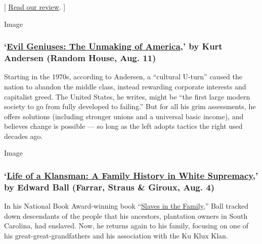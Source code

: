 {[}
\href{https://www.nytimes3xbfgragh.onion/2020/08/04/books/review/the-end-of-everything-katie-mack.html}{Read
our review}. {]}

Image

\hypertarget{evil-geniuses-the-unmaking-of-america-by-kurt-andersen-random-house-aug-11}{%
\subsubsection{\texorpdfstring{`\href{https://www.penguinrandomhouse.com/books/594493/evil-geniuses-by-kurt-andersen/}{Evil
Geniuses: The Unmaking of America},' by Kurt Andersen (Random House,
Aug.
11)}{`Evil Geniuses: The Unmaking of America,' by Kurt Andersen (Random House, Aug. 11)}}\label{evil-geniuses-the-unmaking-of-america-by-kurt-andersen-random-house-aug-11}}

Starting in the 1970s, according to Andersen, a ``cultural U-turn''
caused the nation to abandon the middle class, instead rewarding
corporate interests and capitalist greed. The United States, he writes,
might be ``the first large modern society to go from fully developed to
failing.'' But for all his grim assessments, he offers solutions
(including stronger unions and a universal basic income), and believes
change is possible --- so long as the left adopts tactics the right used
decades ago.

Image

\hypertarget{life-of-a-klansman-a-family-history-in-white-supremacy-by-edward-ball-farrar-straus--giroux-aug-4}{%
\subsubsection{\texorpdfstring{`\href{https://us.macmillan.com/books/9780374186326}{Life
of a Klansman: A Family History in White Supremacy},' by Edward Ball
(Farrar, Straus \& Giroux, Aug.
4)}{`Life of a Klansman: A Family History in White Supremacy,' by Edward Ball (Farrar, Straus \& Giroux, Aug. 4)}}\label{life-of-a-klansman-a-family-history-in-white-supremacy-by-edward-ball-farrar-straus--giroux-aug-4}}

In his National Book Award-winning book
``\href{https://archive.nytimes3xbfgragh.onion/www.nytimes3xbfgragh.onion/books/98/03/01/reviews/980301.01faustt.html}{Slaves
in the Family},'' Ball tracked down descendants of the people that his
ancestors, plantation owners in South Carolina, had enslaved. Now, he
returns again to his family, focusing on one of his
great-great-grandfathers and his association with the Ku Klux Klan.


